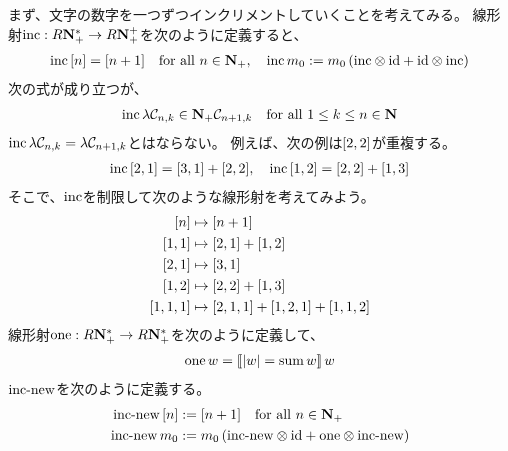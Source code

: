 {	まず、文字の数字を一つずつインクリメントしていくことを考えてみる。
	線形射$\op{inc}:R\sizen_+^*\to R\sizen_+^+$を次のように定義すると、
	\begin{equation*}\begin{split}
		\op{inc}\word{n} = \word{n+1} \quad\text{for all } n\in\sizen_+,\quad
		\op{inc}m_0 := m_0\plr{\op{inc}\otimes\id + \id\otimes\op{inc}}
	\end{split}\end{equation*}
	次の式が成り立つが、
	\begin{equation*}\begin{split}
		\op{inc}\lambda\clC_{n,k}\in\sizen_+\clC_{n+1,k}
			\quad\text{for all } 1\le k\le n\in\sizen
	\end{split}\end{equation*}
	$\op{inc}\lambda\clC_{n,k}=\lambda\clC_{n+1,k}$とはならない。
	例えば、次の例は$\word{2,2}$が重複する。
	\begin{equation*}\begin{split}
		\op{inc}\word{2,1} = \word{3,1} + \word{2,2},\quad
		\op{inc}\word{1,2} = \word{2,2} + \word{1,3}
	\end{split}\end{equation*}
	そこで、$\op{inc}$を制限して次のような線形射を考えてみよう。
	\begin{equation*}\begin{split}
		\word{n} &\mapsto \word{n+1} \\
		\word{1,1} &\mapsto \word{2,1} + \word{1,2} \\
		\word{2,1} &\mapsto \word{3,1} \\
		\word{1,2} &\mapsto \word{2,2}  + \word{1,3} \\
		\word{1,1,1} &\mapsto \word{2,1,1}  + \word{1,2,1} + \word{1,1,2} \\
	\end{split}\end{equation*}
	線形射$\op{one}:R\sizen_+^*\to R\sizen_+^*$を次のように定義して、
	\begin{equation*}\begin{split}
		\op{one} w = \is{|w|=\op{sum}w} w
	\end{split}\end{equation*}
	$\op{inc-new}$を次のように定義する。
	\begin{equation*}\begin{split}
		\op{inc-new}\word{n} &:= \word{n+1} \quad\text{for all } n\in\sizen_+ \\
		\op{inc-new}m_0 &:= m_0\plr{\op{inc-new}\otimes\id + \op{one}\otimes\op{inc-new}}

\end{split}
\end{equation*}}
